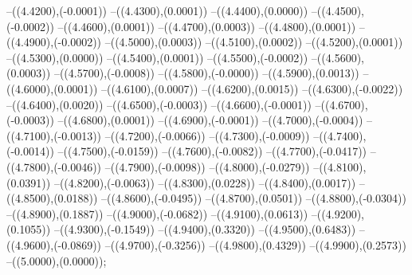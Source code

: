 {	--({\sx*(4.4200)},{\sy*(-0.0001)})
	--({\sx*(4.4300)},{\sy*(0.0001)})
	--({\sx*(4.4400)},{\sy*(0.0000)})
	--({\sx*(4.4500)},{\sy*(-0.0002)})
	--({\sx*(4.4600)},{\sy*(0.0001)})
	--({\sx*(4.4700)},{\sy*(0.0003)})
	--({\sx*(4.4800)},{\sy*(0.0001)})
	--({\sx*(4.4900)},{\sy*(-0.0002)})
	--({\sx*(4.5000)},{\sy*(0.0003)})
	--({\sx*(4.5100)},{\sy*(0.0002)})
	--({\sx*(4.5200)},{\sy*(0.0001)})
	--({\sx*(4.5300)},{\sy*(0.0000)})
	--({\sx*(4.5400)},{\sy*(0.0001)})
	--({\sx*(4.5500)},{\sy*(-0.0002)})
	--({\sx*(4.5600)},{\sy*(0.0003)})
	--({\sx*(4.5700)},{\sy*(-0.0008)})
	--({\sx*(4.5800)},{\sy*(-0.0000)})
	--({\sx*(4.5900)},{\sy*(0.0013)})
	--({\sx*(4.6000)},{\sy*(0.0001)})
	--({\sx*(4.6100)},{\sy*(0.0007)})
	--({\sx*(4.6200)},{\sy*(0.0015)})
	--({\sx*(4.6300)},{\sy*(-0.0022)})
	--({\sx*(4.6400)},{\sy*(0.0020)})
	--({\sx*(4.6500)},{\sy*(-0.0003)})
	--({\sx*(4.6600)},{\sy*(-0.0001)})
	--({\sx*(4.6700)},{\sy*(-0.0003)})
	--({\sx*(4.6800)},{\sy*(0.0001)})
	--({\sx*(4.6900)},{\sy*(-0.0001)})
	--({\sx*(4.7000)},{\sy*(-0.0004)})
	--({\sx*(4.7100)},{\sy*(-0.0013)})
	--({\sx*(4.7200)},{\sy*(-0.0066)})
	--({\sx*(4.7300)},{\sy*(-0.0009)})
	--({\sx*(4.7400)},{\sy*(-0.0014)})
	--({\sx*(4.7500)},{\sy*(-0.0159)})
	--({\sx*(4.7600)},{\sy*(-0.0082)})
	--({\sx*(4.7700)},{\sy*(-0.0417)})
	--({\sx*(4.7800)},{\sy*(-0.0046)})
	--({\sx*(4.7900)},{\sy*(-0.0098)})
	--({\sx*(4.8000)},{\sy*(-0.0279)})
	--({\sx*(4.8100)},{\sy*(0.0391)})
	--({\sx*(4.8200)},{\sy*(-0.0063)})
	--({\sx*(4.8300)},{\sy*(0.0228)})
	--({\sx*(4.8400)},{\sy*(0.0017)})
	--({\sx*(4.8500)},{\sy*(0.0188)})
	--({\sx*(4.8600)},{\sy*(-0.0495)})
	--({\sx*(4.8700)},{\sy*(0.0501)})
	--({\sx*(4.8800)},{\sy*(-0.0304)})
	--({\sx*(4.8900)},{\sy*(0.1887)})
	--({\sx*(4.9000)},{\sy*(-0.0682)})
	--({\sx*(4.9100)},{\sy*(0.0613)})
	--({\sx*(4.9200)},{\sy*(0.1055)})
	--({\sx*(4.9300)},{\sy*(-0.1549)})
	--({\sx*(4.9400)},{\sy*(0.3320)})
	--({\sx*(4.9500)},{\sy*(0.6483)})
	--({\sx*(4.9600)},{\sy*(-0.0869)})
	--({\sx*(4.9700)},{\sy*(-0.3256)})
	--({\sx*(4.9800)},{\sy*(0.4329)})
	--({\sx*(4.9900)},{\sy*(0.2573)})
	--({\sx*(5.0000)},{\sy*(0.0000)});
}
